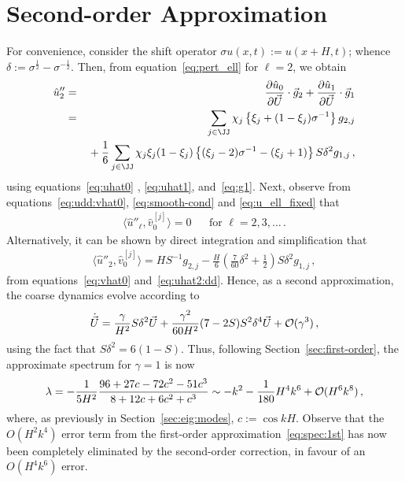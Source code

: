 \documentclass[12pt,a5paper]{article}
\begin{document}
\section{Second-order Approximation}
For convenience, consider the shift operator $\sigma u(x,t) := u(x+H,t)$;
 whence $\delta:=\sigma^{\frac{1}{2}}-\sigma^{-\frac{1}{2}}$.
Then, from equation~\eqref{eq:pert_ell} for $\ell=2$, we obtain
\begin{eqnarray}
  \hat{u}''_2 & = & \D{\vec U}{\hat{u}_0}\cdot{\vec g}_{2}+\D{\vec U}{\hat{u}_1}\cdot{\vec g}_{1}
\nonumber\\
& = & \sum_{j\in\JJ}\chi_j\left\{\xi_j+(1-\xi_j)\sigma^{-1}\right\}g_{2,j}
\nonumber\\
&& {}+\frac{1}{6}\sum_{j\in\JJ}\chi_j\xi_j(1-\xi_j)\left\{
(\xi_j-2)\sigma^{-1}-(\xi_j+1)
\right\}S\delta^2g_{1,j}\,,
\label{eq:uhat2:dd}
\end{eqnarray}
using equations~\eqref{eq:uhat0} , \eqref{eq:uhat1}, and~\eqref{eq:g1}.
Next, observe 
from equations~\eqref{eq:udd:vhat0}, \eqref{eq:smooth-cond} and \eqref{eq:u_ell_fixed} that
\begin{eqnarray}
\langle\hat{u}''_\ell,\hat{v}_0^{[j]}\rangle=0 && \mbox{for }\ell=2,3,\ldots\,.
\end{eqnarray}
Alternatively, it can be shown by direct integration and simplification that
\begin{eqnarray}
\langle\hat{u}''_2,\hat{v}_0^{[j]}\rangle = HS^{-1}g_{2,j}-\frac{H}{6}\left(\frac{7}{60}\delta^2+\frac{1}{2}\right)S\delta^2g_{1,j}\,,
\end{eqnarray}
from equations~\eqref{eq:vhat0} and~\eqref{eq:uhat2:dd}.
Hence, as a second approximation, the coarse dynamics evolve according to
\begin{eqnarray}
	\dot{\vec U} = \frac{\gamma}{H^2}S\delta^2\vec U 
+ \frac{\gamma^2}{60H^2}(7-2S)S^2\delta^4\vec U
+ {\cal O}(\gamma^3)\,,
\end{eqnarray}
using the fact that $S\delta^2=6(1-S)$.
Thus, following Section~\ref{sec:first-order}, the approximate spectrum for $\gamma=1$ is now
\begin{eqnarray}
\lambda = -\frac{1}{5H^2}\frac{96+27c-72c^2-51c^3}{8+12c+6c^2+c^3}
\sim -k^2-\frac{1}{180}H^4k^6+{\cal O}(H^6k^8)\,,
\end{eqnarray}
where, as previously in Section~\ref{sec:eig:modes}, $c:=\cos kH$.
Observe that the $O(H^2k^4)$ error term from the first-order approximation~\eqref{eq:spec:1st} has now been
completely eliminated by the second-order correction, in favour of an $O(H^4k^6)$ error.
\end{document}
